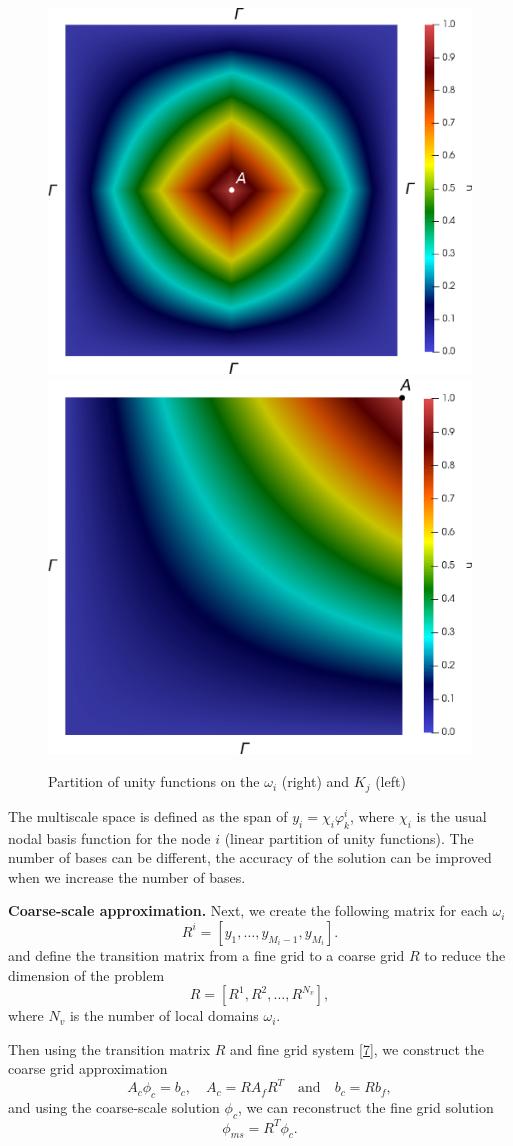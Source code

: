 \documentclass[preprint]{elsarticle}
\begin{document}
\begin{figure}[ht]
	\centering
		\includegraphics[width=0.45\linewidth]{pofs.eps} \hspace{2em}
		\includegraphics[width=0.45\linewidth]{pouK.eps} 
	\caption{Partition of unity functions on the $\omega_i$ (right) and $K_j$ (left)}
	\label{pou}
\end{figure} 
 
The multiscale space is defined as the span of $y_i = \chi_i \varphi^i_k$, where $\chi_i$ is the usual nodal basis function for the node $i$ (linear partition of unity functions). 
The number of bases can be different, the accuracy of the solution can be improved when we increase the number of bases.

\textbf{Coarse-scale approximation.}
Next, we create the following matrix for each $\omega_i$
\[
	R^i = \left[ y_1, \dots, y_{M_i-1},  y_{M_i} \right].
\]
and define the transition matrix from a fine grid to a coarse grid $R$ to reduce the dimension of the problem
\[
	R = [R^1, R^2, \dots, R^{N_v}],
\]
where $N_v$ is the number of local domains $\omega_i$.

Then using the transition matrix $R$ and fine grid system \eqref{7}, we construct the coarse grid approximation
\[
	A_c \phi_c = b_c, \quad 
	A_c = R A_f R^T \quad 
	\text{and} \quad 
	b_c = R b_f,
\]
and using the coarse-scale solution $\phi_c$, we can reconstruct the fine grid solution 
\[
	\phi_{ms} = R^T \phi_c.
\]
\end{document}
